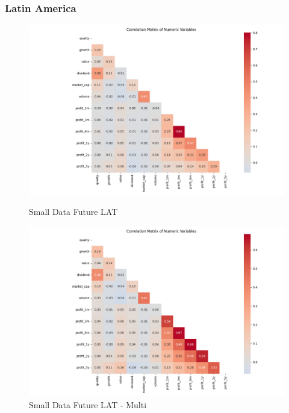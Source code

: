 \documentclass[11pt,english,a4paper,hidelinks]{book}
\begin{document}
\subsubsection{Latin America}
\begin{figure}[H]
    \centering
    \begin{minipage}{0.48\textwidth}
        \centering
        \includegraphics[width=\linewidth]{images/code/descriptive analysis/correlations/Small Data future LAT.png}
        \caption{Small Data Future LAT}
        \label{fig:small_data_future_lat_correlations}
    \end{minipage}
    \begin{minipage}{0.48\textwidth}
        \centering
        \includegraphics[width=\linewidth]{images/code/descriptive analysis/correlations/Small Data future LAT - Multi.png}
        \caption{Small Data Future LAT - Multi}
        \label{fig:small_data_future_lat_multi_correlations}
    \end{minipage}
\end{figure}
\end{document}
